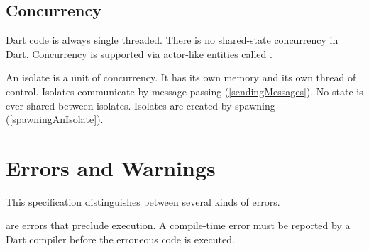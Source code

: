 \documentclass[makeidx]{article}
\begin{document}


\subsection{Concurrency}

\LMHash{}%
Dart code is always single threaded.
There is no shared-state concurrency in Dart.
Concurrency is supported via actor-like entities called .

\LMHash{}%
An isolate is a unit of concurrency.
It has its own memory and its own thread of control.
Isolates communicate by message passing (\ref{sendingMessages}).
No state is ever shared between isolates.
Isolates are created by spawning (\ref{spawningAnIsolate}).


\section{Errors and Warnings}

\LMHash{}%
This specification distinguishes between several kinds of errors.

\LMHash{}%
are errors that preclude execution.
A compile-time error must be reported by a Dart compiler
before the erroneous code is executed.
\end{document}
